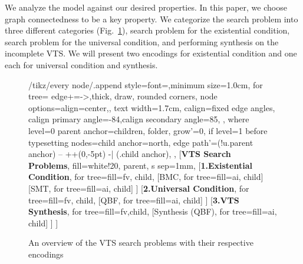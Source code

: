 \noindent %
We analyze the model against our desired properties.
%
%
In this paper, we choose graph connectedness to be a key property.
%
We categorize the search problem into three different categories (Fig.~\ref{fig:vts-search}), search problem for the existential condition, search problem for the universal condition, and performing synthesis on the incomplete VTS. 
%
We will present two encodings for existential condition and one each for universal condition and synthesis.

\begin {figure}[!t]
\centering
\begin{adjustbox}{width=0.9\columnwidth}
	{\Large
		
		\begin{forest}
			/tikz/every node/.append style={font=\sffamily,minimum size=1.0cm},
			for tree={
				edge+={->,thick},%
				draw,
				rounded corners,
				node options={align=center,},
				text width=1.7cm,
				calign=fixed edge angles, calign primary angle=-84,calign secondary angle=85,
			},
			where level=0{%
				parent anchor=children,
			}{%
				folder,
				grow'=0,
				if level=1{%
					before typesetting nodes={child anchor=north},
					edge path'={(!u.parent anchor) -- ++(0,-5pt) -| (.child anchor)},
				}{},
			}
			[\textbf{VTS Search \\ Problems}, fill=white!20, parent, s sep=1mm,
			[\textbf{1.Existential Condition}, for tree={fill=fv, child}, 
			[BMC, for tree={fill=ai, child}]
			[SMT, for tree={fill=ai, child}]
			]
			[\textbf{2.Universal Condition}, for tree={fill=fv, child},
			[QBF, for tree={fill=ai, child}]
			]
			[\textbf{3.VTS Synthesis}, for tree={fill=fv,child}, 
			[Synthesis (QBF), for tree={fill=ai, child}]
			]
			]
		\end{forest}
	}
\end{adjustbox}
\vspace{0.01cm}


\caption{An overview of the VTS search problems with their respective encodings}
\label{fig:vts-search}
\end{figure}

